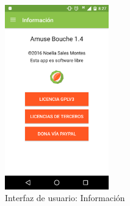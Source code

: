 \begin{figure}[htbp]
  \centering
  \includegraphics[width=0.4\textwidth]{cap5/img/captura_28}
  \caption{Interfaz de usuario: Información}
  \label{fig:captura_28}
\end{figure}

